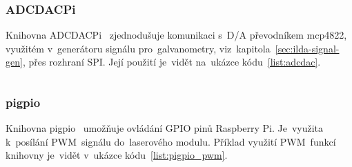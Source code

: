\subsubsection{ADCDACPi}
Knihovna ADCDACPi~\cite{ADCDACPi} zjednodušuje komunikaci s~D/A převodníkem mcp4822, využitém v~generátoru signálu pro~galvanometry, viz~kapitola~\ref{sec:ilda-signal-gen}, přes rozhraní SPI. Její použití je~vidět na~ukázce kódu~\ref{list:adcdac}.
\begin{code}
  \inputminted[frame=lines,fontsize=\footnotesize{}, linenos, breaklines]{cpp}{code_examples/adcdac.cpp}
\end{code}

\subsubsection{pigpio}\label{sec:ls_pigpio}
Knihovna pigpio~\cite{pigpio} umožňuje ovládání GPIO pinů Raspberry Pi. Je~využita k~posílání PWM~signálu do~laserového modulu. Příklad využití PWM~funkcí knihovny je~vidět v~ukázce kódu~\ref{list:pigpio_pwm}.

\begin{code}
  \inputminted[frame=lines,fontsize=\footnotesize{}, linenos, breaklines]{cpp}{code_examples/pigpio_pwm.cpp}
\end{code}


